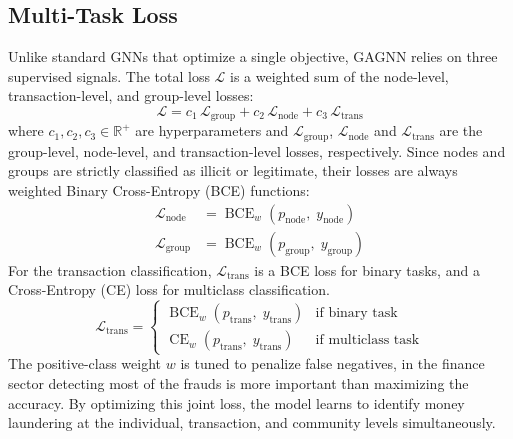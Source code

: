 \subsection{Multi-Task Loss}
\label{sec:loss}
Unlike standard GNNs that optimize a single objective, GAGNN relies on three supervised signals. The total loss $\mathcal{L}$ is a weighted sum of the node-level, transaction-level, and group-level losses:
\begin{equation}
  \mathcal{L} = c_1\,\mathcal{L}_{\text{group}} + c_2\,\mathcal{L}_{\text{node}} + c_3\,\mathcal{L}_{\text{trans}}
\end{equation}
where \(c_1,c_2,c_3 \in \mathbb{R}^+\) are hyperparameters and \(\mathcal{L}_{\text{group}}\), \(\mathcal{L}_{\text{node}}\) and \(\mathcal{L}_{\text{trans}}\) are the group-level, node-level, and transaction-level losses, respectively. Since nodes and groups are strictly classified as illicit or legitimate, their losses are always weighted Binary Cross-Entropy (BCE) functions:
\begin{align}
  \mathcal{L}_{\text{node}} &= \operatorname{BCE}_w\!\left(p_{\text{node}},\; y_{\text{node}}\right) \\
  \mathcal{L}_{\text{group}} &= \operatorname{BCE}_w\!\left(p_{\text{group}},\; y_{\text{group}}\right)
\end{align}
For the transaction classification, $\mathcal{L}_{\text{trans}}$ is a BCE loss for binary tasks, and a Cross-Entropy (CE) loss for multiclass classification.
\begin{equation}
  \mathcal{L}_{\text{trans}} = \begin{cases}
    \operatorname{BCE}_w\!\left(p_{\text{trans}},\; y_{\text{trans}}\right) & \text{if binary task} \\
    \operatorname{CE}_w\!\left(p_{\text{trans}},\; y_{\text{trans}}\right) & \text{if multiclass task}
  \end{cases}
\end{equation}
The positive-class weight $w$ is tuned to penalize false negatives, in the finance sector detecting most of the frauds is more important than maximizing the accuracy. By optimizing this joint loss, the model learns to identify money laundering at the individual, transaction, and community levels simultaneously.

